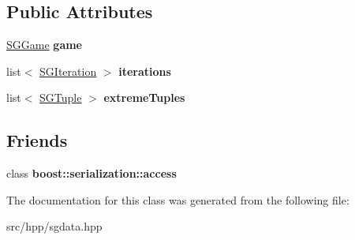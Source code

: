 \subsection*{Public Attributes}
\begin{DoxyCompactItemize}
\item 
\hypertarget{class_s_g_data_ac315814a5c4be6e272a192f3a7e0395c}{\hyperlink{class_s_g_game}{S\+G\+Game} {\bfseries game}}\label{class_s_g_data_ac315814a5c4be6e272a192f3a7e0395c}

\item 
\hypertarget{class_s_g_data_a6361bae00b7e2dcf0c8c0d52ad330314}{list$<$ \hyperlink{class_s_g_iteration}{S\+G\+Iteration} $>$ {\bfseries iterations}}\label{class_s_g_data_a6361bae00b7e2dcf0c8c0d52ad330314}

\item 
\hypertarget{class_s_g_data_a197411a0804166fa2573a1de83046b49}{list$<$ \hyperlink{class_s_g_tuple}{S\+G\+Tuple} $>$ {\bfseries extreme\+Tuples}}\label{class_s_g_data_a197411a0804166fa2573a1de83046b49}

\end{DoxyCompactItemize}
\subsection*{Friends}
\begin{DoxyCompactItemize}
\item 
\hypertarget{class_s_g_data_ac98d07dd8f7b70e16ccb9a01abf56b9c}{class {\bfseries boost\+::serialization\+::access}}\label{class_s_g_data_ac98d07dd8f7b70e16ccb9a01abf56b9c}

\end{DoxyCompactItemize}


The documentation for this class was generated from the following file\+:\begin{DoxyCompactItemize}
\item 
src/hpp/sgdata.\+hpp\end{DoxyCompactItemize}
